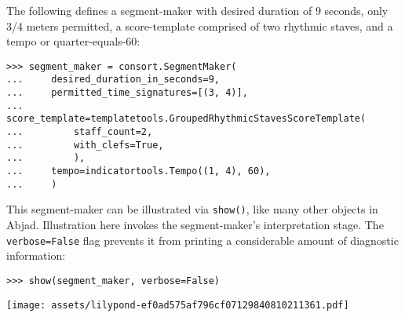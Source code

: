 The following defines a segment-maker with desired duration of 9 seconds, only
3/4 meters permitted, a score-template comprised of two rhythmic staves, and a
tempo or quarter-equals-60:

\begin{comment}
<abjad>
segment_maker = consort.SegmentMaker(
    desired_duration_in_seconds=9,
    permitted_time_signatures=[(3, 4)],
    score_template=templatetools.GroupedRhythmicStavesScoreTemplate(
        staff_count=2,
        with_clefs=True,
        ),
    tempo=indicatortools.Tempo((1, 4), 60),
    )
</abjad>
\end{comment}

\begin{abjadbookoutput}
\begin{singlespacing}
\vspace{-0.5\baselineskip}
\begin{verbatim}
>>> segment_maker = consort.SegmentMaker(
...     desired_duration_in_seconds=9,
...     permitted_time_signatures=[(3, 4)],
...     score_template=templatetools.GroupedRhythmicStavesScoreTemplate(
...         staff_count=2,
...         with_clefs=True,
...         ),
...     tempo=indicatortools.Tempo((1, 4), 60),
...     )
\end{verbatim}
\end{singlespacing}
\end{abjadbookoutput}

\noindent This segment-maker can be illustrated via \texttt{show()}, like many
other objects in Abjad. Illustration here invokes the segment-maker's
interpretation stage. The \texttt{verbose=False} flag prevents it from
printing a considerable amount of diagnostic information:

\begin{comment}
<abjad>[stylesheet=../consort.ily]
show(segment_maker, verbose=False)
</abjad>
\end{comment}

\begin{abjadbookoutput}
\begin{singlespacing}
\vspace{-0.5\baselineskip}
\begin{verbatim}
>>> show(segment_maker, verbose=False)
\end{verbatim}
\noindent\texttt{[image: assets/lilypond-ef0ad575af796cf07129840810211361.pdf]}
\end{singlespacing}
\end{abjadbookoutput}

